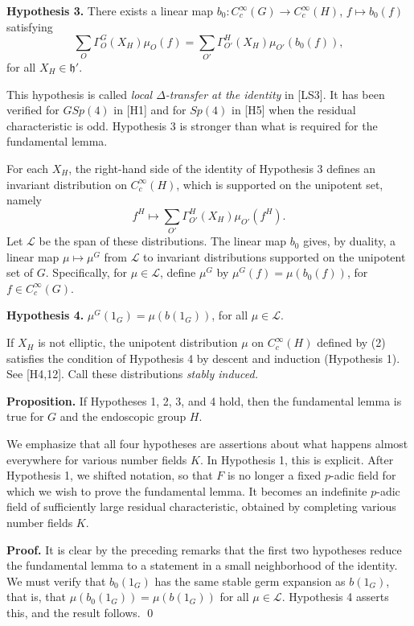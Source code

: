 \documentclass{amsart}
\newcommand\cL{{\mathcal L}}
\newcommand\h{{\mathfrak h}}
\begin{document}
{\bf Hypothesis 3.}  There exists a linear map 
$b_0:C_c^\infty(G) \to C_c^\infty(H)$,
$f\mapsto b_0(f)$ satisfying
$$\sum_{O} \Gamma^G_O (X_H) \mu_O(f) = \sum_{O'}\Gamma^H_{O'}(X_H)
\mu_{O'}(b_0(f)),$$
for all $X_H\in \h'$.

This hypothesis is called {\it local $\Delta$-transfer
at the identity\/}
 in [LS3].  It has
been verified for $GSp(4)$ in [H1] and for $Sp(4)$ in [H5]
when the residual characteristic is odd.
Hypothesis 3 is stronger than what is
required for the fundamental lemma. 

For each $X_H$, the right-hand side of the identity of Hypothesis 3
defines an invariant distribution on $C_c^\infty(H)$, which is supported on the
unipotent set, namely
\begin{equation}
f^H \mapsto \sum_{O'} \Gamma^H_{O'}(X_H)\mu_{O'}(f^H).
\end{equation}
Let $\cL$ be the span of these distributions.
The linear map $b_0$ gives, by duality, a linear map 
$\mu\mapsto\mu^G$ from $\cL$ 
to invariant distributions
supported on the unipotent set of $G$.  Specifically, for $\mu\in\cL$,
define $\mu^G$ by $\mu^G(f) = \mu(b_0(f))$, for $f\in C_c^\infty(G)$.

{\bf Hypothesis 4.}  $\mu^G(1_G) = \mu(b(1_G))$, for all $\mu \in \cL$.

If $X_H$ is not elliptic, the unipotent distribution $\mu$
 on $C^\infty_c(H)$ defined by
 (2) satisfies the condition of Hypothesis 4 by
descent and induction (Hypothesis 1). See [H4,12].
Call these distributions {\it stably induced.}

{\bf Proposition.}  If Hypotheses 1, 2, 3, and 4 
hold, then the fundamental lemma is true for $G$ and the
endoscopic group $H$.

We emphasize that all four hypotheses are assertions
about what happens almost everywhere for various number
fields $K$.  In Hypothesis 1, this is explicit.  After
Hypothesis 1, we shifted notation, so that $F$ is no
longer a fixed $p$-adic field for which we wish to prove
the fundamental lemma.  It becomes an indefinite $p$-adic field
of sufficiently large residual characteristic, obtained
by completing various number fields $K$.

{\bf Proof.} It is clear by the preceding remarks that
the first two hypotheses reduce the fundamental lemma
to a statement in a small neighborhood of the identity.
We must verify that $b_0(1_G)$ has the same stable
germ expansion as $b(1_G)$, that is, that $\mu(b_0(1_G))=
\mu(b(1_G))$ for all $\mu\in\cL$.  Hypothesis 4 asserts
this, and the result follows. \qed
\end{document}
